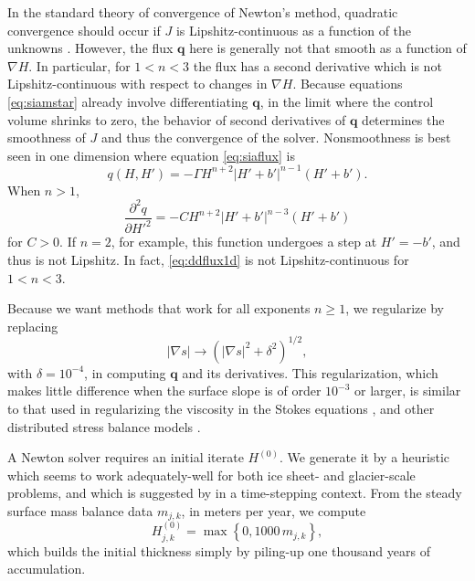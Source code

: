 \documentclass[twocolumn,a4paper]{igs}
\newcommand\bq{\mathbf{q}}
\newcommand{\grad}{\nabla}
\begin{document}
In the standard theory of convergence of Newton's method, quadratic convergence should occur if $J$ is Lipshitz-continuous as a function of the unknowns \citep{Kelley2003}.  However, the flux $\bq$ here is generally not that smooth as a function of $\grad H$.  In particular, for $1<n<3$ the flux has a second derivative which is not Lipshitz-continuous with respect to changes in $\grad H$.  Because equations \eqref{eq:siamstar} already involve differentiating $\bq$, in the limit where the control volume shrinks to zero, the behavior of second derivatives of $\bq$ determines the smoothness of $J$ and thus the convergence of the solver.  Nonsmoothness is best seen in one dimension where equation \eqref{eq:siaflux} is
\begin{equation}
q(H,H') = - \Gamma H^{n+2} \left|H'+b'\right|^{n-1} (H'+b'). \label{eq:flux1d}
\end{equation}
When $n>1$,
\begin{equation}
\frac{\partial^2 q}{\partial H'^2} = - C H^{n+2} \left|H'+b'\right|^{n-3} (H'+b') \label{eq:ddflux1d}
\end{equation}
for $C>0$.  If $n=2$, for example, this function undergoes a step at $H'=-b'$, and thus is not Lipshitz.  In fact, \eqref{eq:ddflux1d} is not Lipshitz-continuous for $1<n<3$.

Because we want methods that work for all exponents $n\ge 1$, we regularize by replacing
\begin{equation}
|\grad s| \to \left(|\grad s|^2 + \delta^2\right)^{1/2}, \label{eq:nonlinregularization}
\end{equation}
with $\delta = 10^{-4}$, in computing $\bq$ and its derivatives.  This regularization, which makes little difference when the surface slope is of order $10^{-3}$ or larger, is similar to that used in regularizing the viscosity in the Stokes equations \citep{GreveBlatter2009}, and other distributed stress balance models \citep[for example]{BrownSmithAhmadia2013,BuelerBrown2009}.

A Newton solver requires an initial iterate $H^{(0)}$.  We generate it by a heuristic which seems to work adequately-well for both ice sheet- and glacier-scale problems, and which is suggested by \cite{JouvetGraeser2013} in a time-stepping context.  From the steady surface mass balance data $m_{j,k}$, in meters per year, we compute
\begin{equation}
H_{j,k}^{(0)} = \max\left\{0,1000\,m_{j,k}\right\},  \label{eq:nonlininitialheuristic}
\end{equation}
which builds the initial thickness simply by piling-up one thousand years of accumulation.
\end{document}
